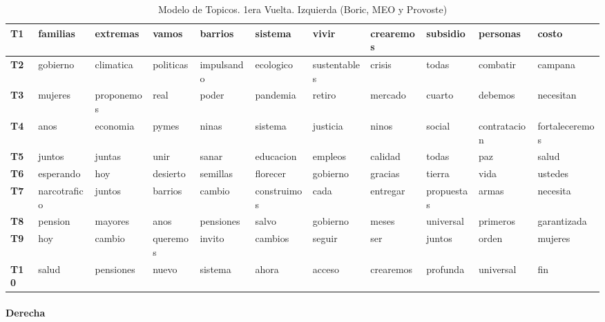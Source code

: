 \documentclass[
  10pt,
  letterpaper,
]{report}
\begin{document}
\begin{table}[!h]

\caption{\label{tab:Tabla7_izq}Modelo de Topicos. 1era Vuelta. Izquierda (Boric, MEO y Provoste)}
\centering
\fontsize{6}{8}\selectfont
\begin{tabular}[t]{>{\raggedright\arraybackslash}p{0.08in}|>{\raggedright\arraybackslash}p{0.4in}|>{\raggedright\arraybackslash}p{0.4in}|>{\raggedright\arraybackslash}p{0.4in}|>{\raggedright\arraybackslash}p{0.4in}|>{\raggedright\arraybackslash}p{0.4in}|>{\raggedright\arraybackslash}p{0.4in}|>{\raggedright\arraybackslash}p{0.4in}|>{\raggedright\arraybackslash}p{0.4in}|>{\raggedright\arraybackslash}p{0.4in}|l}
\hline
T1 & familias & extremas & vamos & barrios & sistema & vivir & crearemos & subsidio & personas & costo\\
\hline
\textbf{T2} & gobierno & climatica & politicas & impulsando & ecologico & sustentables & crisis & todas & combatir & campana\\
\hline
\textbf{T3} & mujeres & proponemos & real & poder & pandemia & retiro & mercado & cuarto & debemos & necesitan\\
\hline
\textbf{T4} & anos & economia & pymes & ninas & sistema & justicia & ninos & social & contratacion & fortaleceremos\\
\hline
\textbf{T5} & juntos & juntas & unir & sanar & educacion & empleos & calidad & todas & paz & salud\\
\hline
\textbf{T6} & esperando & hoy & desierto & semillas & florecer & gobierno & gracias & tierra & vida & ustedes\\
\hline
\textbf{T7} & narcotrafico & juntos & barrios & cambio & construimos & cada & entregar & propuestas & armas & necesita\\
\hline
\textbf{T8} & pension & mayores & anos & pensiones & salvo & gobierno & meses & universal & primeros & garantizada\\
\hline
\textbf{T9} & hoy & cambio & queremos & invito & cambios & seguir & ser & juntos & orden & mujeres\\
\hline
\textbf{T10} & salud & pensiones & nuevo & sistema & ahora & acceso & crearemos & profunda & universal & fin\\
\hline
\end{tabular}
\end{table}

\hypertarget{derecha}{%
\paragraph{Derecha}\label{derecha}}
\end{document}
